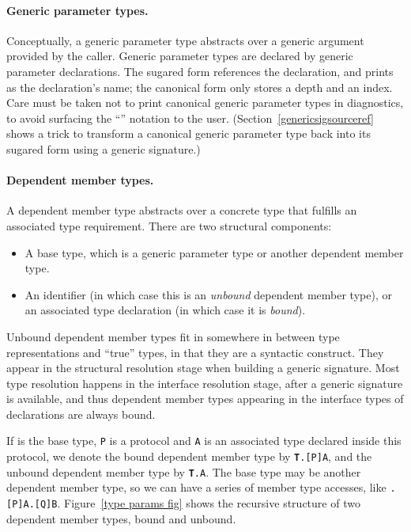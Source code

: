 \documentclass[../generics]{subfiles}
\begin{document}
\paragraph{Generic parameter types.} Conceptually, a generic parameter type abstracts over a generic argument provided by the caller. Generic parameter types are declared by generic parameter declarations. The sugared form references the declaration, and prints as the declaration's name; the canonical form only stores a depth and an index. Care must be taken not to print canonical generic parameter types in diagnostics, to avoid surfacing the ``'' notation to the user. (Section~\ref{genericsigsourceref} shows a trick to transform a canonical generic parameter type back into its sugared form using a generic signature.)

\paragraph{Dependent member types.}
A dependent member type abstracts over a concrete type that fulfills an associated type requirement. There are two structural components:
\begin{itemize}
\item A base type, which is a generic parameter type or another dependent member type.
\item An identifier (in which case this is an \emph{unbound} dependent member type), or an associated type declaration (in which case it is \emph{bound}).
\end{itemize}

Unbound dependent member types fit in somewhere in between type representations and ``true'' types, in that they are a syntactic construct. They appear in the structural resolution stage when building a generic signature. Most type resolution happens in the interface resolution stage, after a generic signature is available, and thus dependent member types appearing in the interface types of declarations are always bound.

If  is the base type, \texttt{P} is a protocol and \texttt{A} is an associated type declared inside this protocol, we denote the bound dependent member type by \texttt{\textbf{T}.[P]A}, and the unbound dependent member type by \texttt{\textbf{T}.A}. The base type  may be another dependent member type, so we can have a series of member type accesses, like \texttt{.[P]A.[Q]B}. Figure~\ref{type params fig} shows the recursive structure of two dependent member types, bound and unbound.
\end{document}
